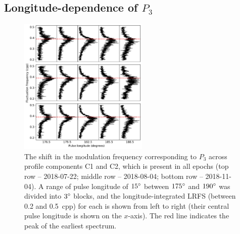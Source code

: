 \subsection{Longitude-dependence of \texorpdfstring{$P_3$}{P3}}
\label{sec: J1518 - analysis - drifting P3}
\begin{figure}
    \begin{center}
        \includegraphics[width=0.55\textwidth]{Figures/J1518/drifting_P3}
        \caption[Drifting $P_3$ values in the main profile components]{The shift in the modulation frequency corresponding to $P_3$ across profile components C1 and C2, which is present in all epochs (top row -- 2018-07-22; middle row -- 2018-08-04; bottom row -- 2018-11-04). A range of pulse longitude of $15^\circ$ between $175^\circ$ and $190^\circ$ was divided into $3^\circ$ blocks, and the longitude-integrated LRFS (between 0.2 and 0.5~cpp) for each is shown from left to right (their central pulse longitude is shown on the $x$-axis). The red line indicates the peak of the earliest spectrum.}
        \label{fig: J1518 - drifting P3 components}
    \end{center}
\end{figure}

